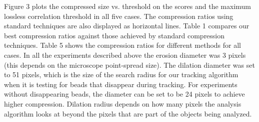 Figure 3 plots the compressed size vs. threshold on the scores and the maximum lossless correlation threshold in all five cases. The compression ratios using standard techniques are also displayed as horizontal lines. Table 1 compares our best compression ratios against those achieved by standard compression techniques.  Table 5 shows the compression ratios for different methods for all cases.
In all the experiments described above the erosion diameter was 3 pixels (this depends on the microscope point-spread size).  The dilation diameter was set to 51 pixels, which is the size of the search radius for our tracking algorithm when it is testing for beads that disappear during tracking.  For experiments without disappearing beads, the diameter can be set to be 24 pixels to achieve higher compression.  Dilation radius depends on how many pixels the analysis algorithm looks at beyond the pixels that are part of the objects being analyzed.

